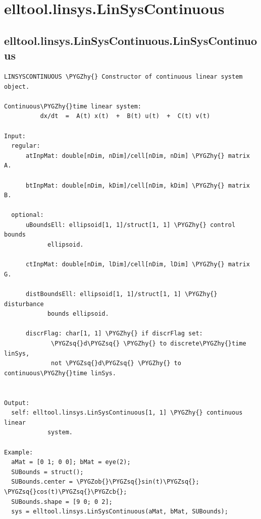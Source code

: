 \documentclass[letterpaper,10pt,english]{sphinxmanual}
\def\PYGZob{\char`\{}
\def\PYGZcb{\char`\}}
\def\PYGZhy{\char`\-}
\def\PYGZsq{\char`\'}
\begin{document}
\section{elltool.linsys.LinSysContinuous}
\label{chap_functions:elltool-linsys-linsyscontinuous}

\subsection{elltool.linsys.LinSysContinuous.LinSysContinuous}
\label{chap_functions:elltool-linsys-linsyscontinuous-linsyscontinuous}
\begin{Verbatim}[commandchars=\\\{\}]
LINSYSCONTINUOUS \PYGZhy{} Constructor of continuous linear system object.

Continuous\PYGZhy{}time linear system:
          dx/dt  =  A(t) x(t)  +  B(t) u(t)  +  C(t) v(t)

Input:
  regular:
      atInpMat: double[nDim, nDim]/cell[nDim, nDim] \PYGZhy{} matrix A.

      btInpMat: double[nDim, kDim]/cell[nDim, kDim] \PYGZhy{} matrix B.

  optional:
      uBoundsEll: ellipsoid[1, 1]/struct[1, 1] \PYGZhy{} control bounds
            ellipsoid.

      ctInpMat: double[nDim, lDim]/cell[nDim, lDim] \PYGZhy{} matrix G.

      distBoundsEll: ellipsoid[1, 1]/struct[1, 1] \PYGZhy{} disturbance
            bounds ellipsoid.

      discrFlag: char[1, 1] \PYGZhy{} if discrFlag set:
             \PYGZsq{}d\PYGZsq{} \PYGZhy{} to discrete\PYGZhy{}time linSys,
             not \PYGZsq{}d\PYGZsq{} \PYGZhy{} to continuous\PYGZhy{}time linSys.


Output:
  self: elltool.linsys.LinSysContinuous[1, 1] \PYGZhy{} continuous linear
            system.

Example:
  aMat = [0 1; 0 0]; bMat = eye(2);
  SUBounds = struct();
  SUBounds.center = \PYGZob{}\PYGZsq{}sin(t)\PYGZsq{}; \PYGZsq{}cos(t)\PYGZsq{}\PYGZcb{};
  SUBounds.shape = [9 0; 0 2];
  sys = elltool.linsys.LinSysContinuous(aMat, bMat, SUBounds);
\end{Verbatim}
\end{document}
